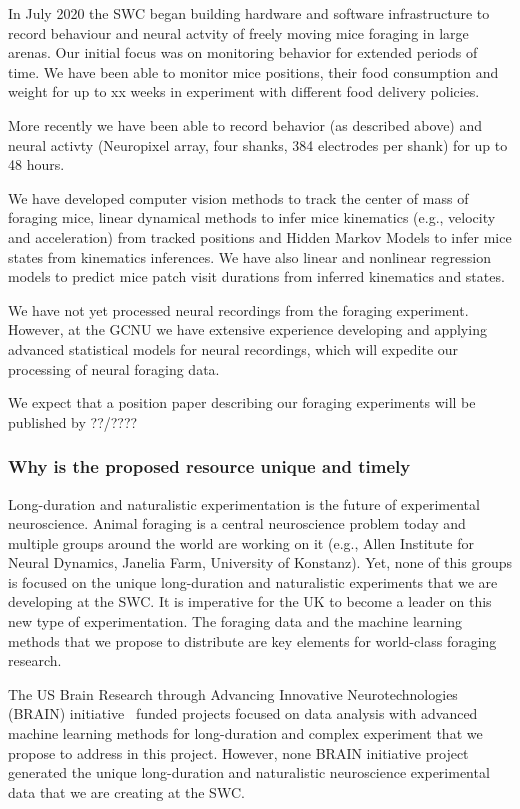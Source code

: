 In July 2020 the SWC began building hardware and software infrastructure to
record behaviour and neural actvity of freely moving mice foraging in large
arenas. Our initial focus was on monitoring behavior for extended periods of
time. We have been able to monitor mice positions, their food consumption and
weight for up to xx weeks in experiment with different food delivery policies.

More recently we have been able to record behavior (as described above) and
neural activty (Neuropixel array, four shanks, 384 electrodes per shank) for up
to 48 hours.

We have developed computer vision methods to track the center of mass of
foraging mice, linear dynamical methods to infer mice kinematics (e.g.,
velocity and acceleration) from tracked positions and Hidden Markov Models to
infer mice states from kinematics inferences.
%
We have also linear and nonlinear regression models to predict mice patch
visit durations from inferred kinematics and states.

We have not yet processed neural recordings from the foraging experiment.
However, at the GCNU we have extensive experience developing and applying
advanced statistical models for neural recordings, which will expedite our
processing of neural foraging data.

We expect that a position paper describing our foraging experiments will be
published by ??/????

\subsubsection*{Why is the proposed resource unique and timely}


Long-duration and naturalistic experimentation is the future of experimental
neuroscience.  Animal foraging is a central neuroscience problem today and
multiple groups around the world are working on it (e.g., Allen Institute for
Neural Dynamics, Janelia Farm, University of Konstanz). Yet, none of this
groups is focused on the unique long-duration and naturalistic experiments that
we are developing at the SWC. It is imperative for the UK to become a leader on
this new type of experimentation. The foraging data and the machine learning
methods that we propose to distribute are key elements for world-class foraging
research.

The US Brain Research through Advancing Innovative Neurotechnologies (BRAIN)
initiative~\citep{jorgensonEtAl15} funded projects focused on data analysis
with advanced machine learning methods for long-duration and complex experiment
that we propose to address in this project. However, none BRAIN initiative
project generated the unique long-duration and naturalistic neuroscience
experimental data that we are creating at the SWC.

